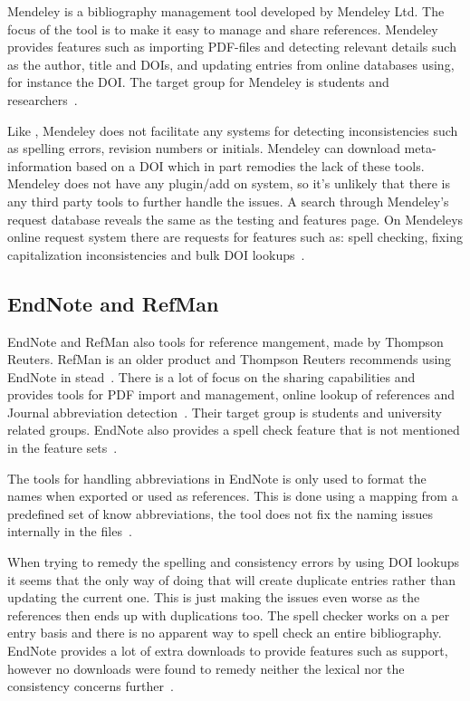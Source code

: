 Mendeley is a bibliography management tool developed by Mendeley Ltd.
The focus of the tool is to make it easy to manage and share
references.  Mendeley provides features such as importing PDF-files
and detecting relevant details such as the author, title and DOIs, and
updating entries from online databases using, for instance the DOI.
The target group for Mendeley is students and
researchers~\cite{mendeley_features}.

Like {\bibtex}, Mendeley does not facilitate any systems for detecting
inconsistencies such as spelling errors, revision numbers or initials.
Mendeley can download meta-information based on a DOI which in part
remodies the lack of these tools.  Mendeley does not have any
plugin/add on system, so it's unlikely that there is any third party
tools to further handle the {\bibtex} issues. A search through
Mendeley's request database reveals the same as the testing and
features page.  On Mendeleys online request system there are requests
for features such as: spell checking, fixing capitalization
inconsistencies and bulk DOI
lookups~\cite{mendeley_request_spellcheck, mendeley_request_lowercase,
  mendeley_request_capitalization, mendeley_request_bulk_doi}.

\subsection{EndNote and RefMan}
EndNote and RefMan also tools for reference mangement, made by
Thompson Reuters.  RefMan is an older product and Thompson Reuters
recommends using EndNote in stead~\cite{refman_switch,
  refman_features}.  There is a lot of focus on the sharing
capabilities and provides tools for PDF import and management, online
lookup of references and Journal abbreviation
detection~\cite{endnote_basic_features, endnote_x7_features}.  Their
target group is students and university related groups.  EndNote also
provides a spell check feature that is not mentioned in the feature
sets~\cite{endnote_spellcheck}.

The tools for handling abbreviations in EndNote is only used to format
the names when exported or used as references.  This is done using a
mapping from a predefined set of know abbreviations, the tool does not
fix the naming issues internally in the
files~\cite{endnote_terms_journals}.

When trying to remedy the spelling and consistency errors by using DOI
lookups it seems that the only way of doing that will create duplicate
entries rather than updating the current one. This is just making the
issues even worse as the references then ends up with duplications
too.  The spell checker works on a per entry basis and there is no
apparent way to spell check an entire bibliography.  EndNote provides
a lot of extra downloads to provide features such as {\bibtex}
support, however no downloads were found to remedy neither the lexical
nor the consistency concerns further~\cite{endnote_downloads}.


